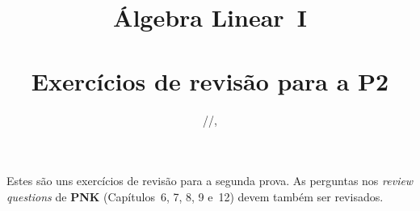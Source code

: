 \documentclass[11pt,reqno,a4paper]{amsart}
\begin{document}
\parindent=0pt

\title[MAC0122 Álgebra Linear I]%
{Álgebra Linear~I\\
  \bigskip{}\\
  \bigskip\bigskip Exercícios de revisão para a P2
}  

\shortdate
\yyyymmdddate
{}
\def\today{\number\year/\number\month/\number\day}
\date{\today, \currenttime}
\footskip=28pt

\maketitle
\thispagestyle{empty} 
\pagestyle{plain}
\onehalfspace

\noindent
Estes são uns exercícios de revisão para a segunda prova.  As
perguntas nos \textit{review questions} de \textbf{PNK} (Capítulos~6,
7, 8, 9 e~12) devem também ser revisados.

\medskip
\bigskip
\end{document}
